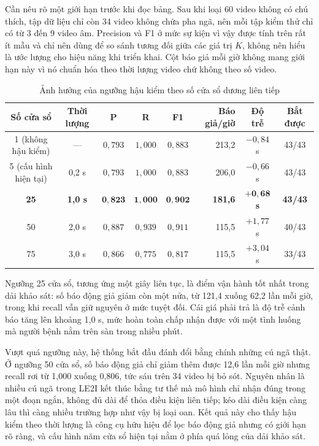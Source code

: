 Cần nêu rõ một giới hạn trước khi đọc bảng. Sau khi loại 60 video không có chú thích, tập dữ liệu chỉ còn 34 video không chứa pha ngã, nên mỗi tập kiểm thử chỉ có từ 3 đến 9 video âm. Precision và F1 ở mức sự kiện vì vậy được tính trên rất ít mẫu và chỉ nên dùng để so sánh tương đối giữa các giá trị $K$, không nên hiểu là ước lượng cho hiệu năng khi triển khai. Cột báo giả mỗi giờ không mang giới hạn này vì nó chuẩn hóa theo thời lượng video chứ không theo số video.

\begin{table}[htbp]
\centering
\caption{Ảnh hưởng của ngưỡng hậu kiểm theo số cửa sổ dương liên tiếp}
\label{tab:lstm_postcheck}
\footnotesize
\setlength{\tabcolsep}{3.5pt}
\begin{tabular}{|c|c|c|c|c|r|c|c|}
\hline
\textbf{Số cửa sổ} & \textbf{Thời lượng} & \textbf{P} & \textbf{R} & \textbf{F1} & \textbf{Báo giả/giờ} & \textbf{Độ trễ} & \textbf{Bắt được} \\
\hline
1 (không hậu kiểm) & --- & $0{,}793$ & $1{,}000$ & $0{,}883$ & 213,2 & $-0{,}84$ s & 43/43 \\
\hline
5 (cấu hình hiện tại) & 0,2 s & $0{,}793$ & $1{,}000$ & $0{,}883$ & 206,0 & $-0{,}66$ s & 43/43 \\
\hline
\textbf{25} & \textbf{1,0 s} & $\mathbf{0{,}823}$ & $\mathbf{1{,}000}$ & $\mathbf{0{,}902}$ & \textbf{181,6} & $\mathbf{+0{,}68}$ \textbf{s} & \textbf{43/43} \\
\hline
50 & 2,0 s & $0{,}887$ & $0{,}939$ & $0{,}911$ & 115,5 & $+1{,}77$ s & 40/43 \\
\hline
75 & 3,0 s & $0{,}866$ & $0{,}775$ & $0{,}817$ & 115,5 & $+3{,}04$ s & 33/43 \\
\hline
\end{tabular}
\end{table}

Ngưỡng 25 cửa sổ, tương ứng một giây liên tục, là điểm vận hành tốt nhất trong dải khảo sát: số báo động giả giảm còn một nửa, từ 121,4 xuống 62,2 lần mỗi giờ, trong khi recall vẫn giữ nguyên ở mức tuyệt đối. Cái giá phải trả là độ trễ cảnh báo tăng lên khoảng 1,0 s, mức hoàn toàn chấp nhận được với một tình huống mà người bệnh nằm trên sàn trong nhiều phút.

Vượt quá ngưỡng này, hệ thống bắt đầu đánh đổi bằng chính những cú ngã thật. Ở ngưỡng 50 cửa sổ, số báo động giả chỉ giảm thêm được 12,6 lần mỗi giờ nhưng recall rơi từ 1,000 xuống 0,806, tức sáu trên 34 video bị bỏ sót. Nguyên nhân là nhiều cú ngã trong LE2I kết thúc bằng tư thế mà mô hình chỉ nhận đúng trong một đoạn ngắn, không đủ dài để thỏa điều kiện liên tiếp; kéo dài điều kiện càng lâu thì càng nhiều trường hợp như vậy bị loại oan. Kết quả này cho thấy hậu kiểm theo thời lượng là công cụ hữu hiệu để lọc báo động giả nhưng có giới hạn rõ ràng, và cấu hình năm cửa sổ hiện tại nằm ở phía quá lỏng của dải khảo sát.


